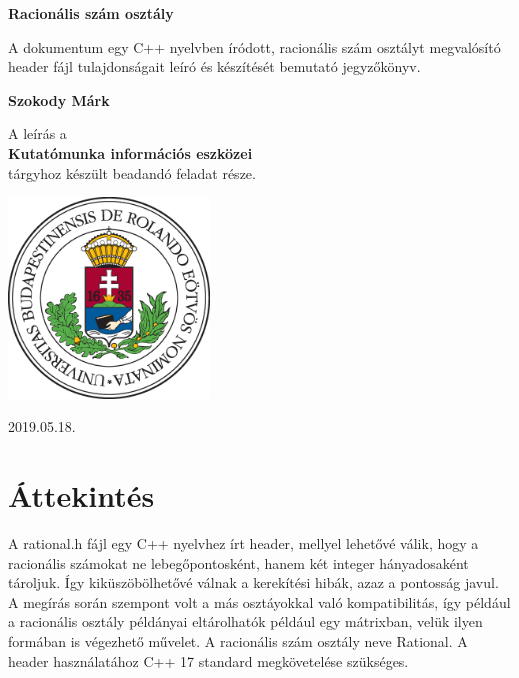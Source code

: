 \documentclass[a4paper, 12pt]{article}
\begin{document}
\begin{titlepage}
    \begin{center}
        \vspace*{1cm}
 
        \Huge
        \textbf{Racionális szám osztály\\}
 
        \vspace{0.5cm}
        \Large
	A dokumentum egy C++ nyelvben íródott, racionális szám osztályt megvalósító header fájl tulajdonságait leíró és készítését			bemutató jegyzőkönyv.
 
        \vspace{1.5cm}
 
        \textbf{ Szokody Márk\\}
 
        \vfill

        \large  

        A leírás a\\
       \textbf{ Kutatómunka információs eszközei}\\
        tárgyhoz készült beadandó feladat része.
 
        \vspace{0.8cm}
 
        \includegraphics[width=0.4\textwidth]{elte.eps}
 
        \Large
        2019.05.18.
 
    \end{center}
\end{titlepage}

\section{Áttekintés}
A rational.h fájl egy C++ nyelvhez írt header, mellyel lehetővé válik, hogy a racionális számokat ne lebegőpontosként,
hanem két integer hányadosaként tároljuk. Így kiküszöbölhetővé válnak a kerekítési hibák, azaz a pontosság javul.
A megírás során szempont volt a más osztáyokkal való kompatibilitás, így például a racionális osztály példányai eltárolhatók például
egy mátrixban, velük ilyen formában is végezhető művelet. A racionális szám osztály neve Rational. A header használatához C++ 17 standard megkövetelése szükséges.
\end{document}
